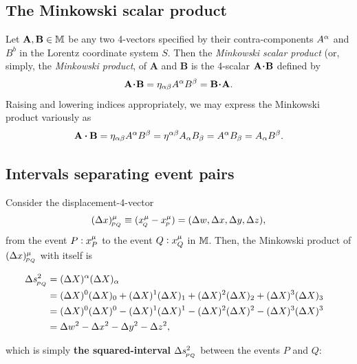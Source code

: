 \subsection{The Minkowski scalar product}
Let $ \mathbf{A},  \mathbf{B}  \in \mathbb{M} $ be 
any two 4-vectors specified by their 
contra-components  $ A^{{\alpha}}$ and $ B^b $ in the 
Lorentz coordinate system $ S $. Then the 
\textsl{Minkowski scalar product} (or, simply, the 
\textsl{Minkowski product}, of $ \mathbf{A}$ and 
$\mathbf{B}$ is the {4-scalar} $\mathbf{A} \minp 
\mathbf{B}$ defined by
\begin{align}\label{mw.21}
\mathbf{A} \minp \mathbf{B}=\gky_{\gka\gkb}A^\gka
B^\gkb= \mathbf{B} \minp \mathbf{A}.
\end{align}
Raising and lowering indices appropriately, we may 
express the Minkowski product variously as
\begin{align}\label{mw.22}
\mathbf{A}\,\minp\,
\mathbf{B}=\gky_{\gka\gkb}
A^\gka B^\gkb=\gky^{\gka\gkb}
A_\gka B_\gkb=A^\gka B_\gkb=A_\gka B^\gkb.
\end{align}

\subsection{Intervals separating event pairs} 
Consider the displacement-4-vector  
\[ (\Delta x)^{{\mu}}_{_{\hspace*{-1.5pt}{PQ}}} \equiv (x^{{\mu}}_{_{\hspace*{-1.5pt}{Q}}} 
-x^{{\mu}}_{_{\hspace*{-1.5pt}{P}}}) =(\Delta w,\Delta x,\Delta y,\Delta z),
\]  
from the event $P:x^{{\mu}}_P$ to the event $Q:x^{{\mu}}_Q$ in 
$\mathbb{M}$. Then, the Minkowski product of $(\Delta 
x)^{{\mu}}_{_{\hspace*{-1.5pt}{PQ}}} $ with itself is 
\begin{scriptsize}
\begin{align}\label{mw.23}
\hspace{-3mm}\Delta s_\sfx{PQ}^2 & = (\Delta X)^\gka 
(\Delta X)_\gka\notag\\
&=(\Delta X)^0 (\Delta X)_0+(\Delta 
X)^1 (\Delta X)_1+(\Delta X)^2 (\Delta X)_2+(\Delta X)^3 
(\Delta X)_3\notag\\
&=(\Delta X)^0 (\Delta X)^0-(\Delta 
X)^1 (\Delta X)^1-(\Delta X)^2 (\Delta X)^2-(\Delta X)^3 
(\Delta X)^3\notag\\
&=\Delta w^2-\Delta x^2-\Delta y^2-\Delta z^2,
\end{align}
\end{scriptsize}
\nnt which is simply \textbf{the squared-interval} 
$ \Delta s_{_{\hspace*{-1.5pt}{PQ}}}^2 $ between the events $P$ and $Q$:

